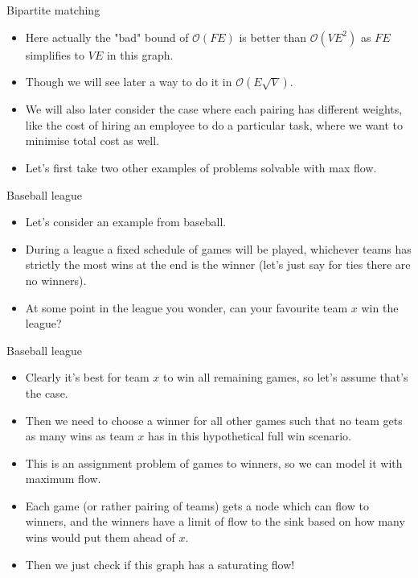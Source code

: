 \documentclass{beamer}
\begin{document}
	\begin{frame}[plain]{Bipartite matching}
		\begin{itemize}
			\item Here actually the "bad" bound of $\mathcal{O}(FE)$ is better than $\mathcal{O}(VE^2)$ as $FE$ simplifies to $VE$ in this graph.
			\item Though we will see later a way to do it in $\mathcal{O}(E\sqrt{V})$.
			\item We will also later consider the case where each pairing has different weights, like the cost of hiring an employee to do a particular task, where we want to minimise total cost as well.
			\item Let's first take two other examples of problems solvable with max flow.
		\end{itemize}
	\end{frame}
	
	\begin{frame}[plain]{Baseball league}
		\begin{itemize}
			\item Let's consider an example from baseball.
			\item During a league a fixed schedule of games will be played, whichever teams has strictly the most wins at the end is the winner (let's just say for ties there are no winners).
			\item At some point in the league you wonder, can your favourite team $x$ win the league?
		\end{itemize}
	\end{frame}
	
	\begin{frame}[plain]{Baseball league}
		\begin{itemize}
			\item Clearly it's best for team $x$ to win all remaining games, so let's assume that's the case.
			\item Then we need to choose a winner for all other games such that no team gets as many wins as team $x$ has in this hypothetical full win scenario.
			\item This is an assignment problem of games to winners, so we can model it with maximum flow.
			\item Each game (or rather pairing of teams) gets a node which can flow to winners, and the winners have a limit of flow to the sink based on how many wins would put them ahead of $x$.
			\item Then we just check if this graph has a saturating flow!
		\end{itemize}
	\end{frame}
	
\end{document}
